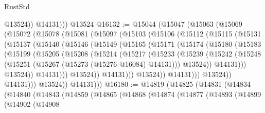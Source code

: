\begin{lexlean}{RustStd}
\begin{coremodule}
              @13524))
          @14131)))
    @13524
@16132 := @15044
    (@15047
      (@15063
        (@15069
          (@15072
            (@15078
              (@15081
                (@15097
                  (@15103
                    (@15106
                      (@15112
                        (@15115
                          (@15131
                            (@15137
                              (@15140
                                (@15146
                                  (@15149
                                    (@15165
                                      (@15171
                                        (@15174
                                          (@15180
                                            (@15183
                                              (@15199
                                                (@15205
                                                  (@15208
                                                    (@15214
                                                      (@15217
                                                        (@15233
                                                          (@15239
                                                            (@15242
                                                              (@15248
                                                                (@15251
                                                                  (@15267
                                                                    (@15273
                                                                      (@15276 @16084)
                                                                      @14131)))
                                                                @13524))
                                                            @14131)))
                                                      @13524))
                                                  @14131)))
                                            @13524))
                                        @14131)))
                                  @13524))
                              @14131)))
                        @13524))
                    @14131)))
              @13524))
          @14131)))
@16180 := @14819
    (@14825
      (@14831
        (@14834
          (@14840
            (@14843
              (@14859
                (@14865
                  (@14868
                    (@14874
                      (@14877
                        (@14893
                          (@14899
                            (@14902
                              (@14908

\end{coremodule}
\end{lexlean}

